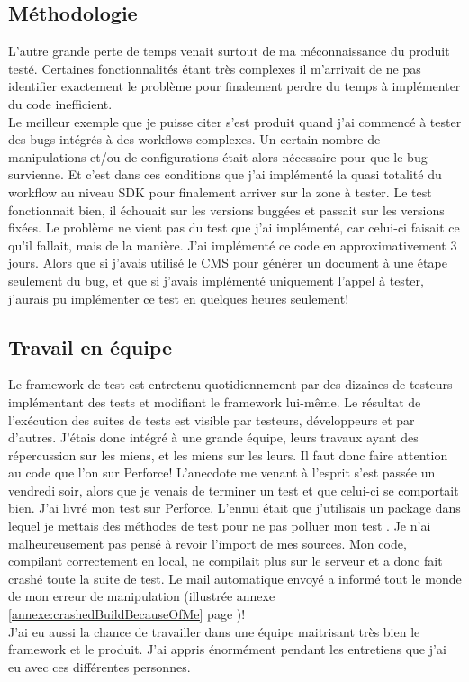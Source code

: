 \subsection{M\'{e}thodologie}
L'autre grande perte de temps venait surtout de ma m\'{e}connaissance du produit test\'{e}. Certaines fonctionnalit\'{e}s \'{e}tant tr\`{e}s complexes il m'arrivait de ne pas identifier exactement le probl\`{e}me pour finalement perdre du temps \`{a} impl\'{e}menter du code inefficient.\\
Le meilleur exemple que je puisse citer s'est produit quand j'ai commenc\'{e} \`{a} tester des bugs int\'{e}gr\'{e}s \`{a} des workflows complexes. Un certain nombre de manipulations et/ou de configurations \'{e}tait alors n\'{e}cessaire pour que le bug survienne. Et c'est dans ces conditions que j'ai impl\'{e}ment\'{e} la quasi totalit\'{e} du workflow au niveau SDK pour finalement arriver sur la zone \`{a} tester. Le test fonctionnait bien, il \'{e}chouait sur les versions bugg\'{e}es et passait sur les versions fix\'{e}es. Le probl\`{e}me ne vient pas du test que j'ai impl\'{e}ment\'{e}, car celui-ci faisait ce qu'il fallait, mais de la mani\`{e}re. J'ai impl\'{e}ment\'{e} ce code en approximativement 3 jours. Alors que si j'avais utilis\'{e} le CMS pour g\'{e}n\'{e}rer un document \`{a} une \'{e}tape seulement du bug, et que si j'avais impl\'{e}ment\'{e} uniquement l'appel \`{a} tester, j'aurais pu impl\'{e}menter ce test en quelques heures seulement!

\subsection{Travail en \'{e}quipe}
Le framework de test est entretenu quotidiennement par des dizaines de testeurs impl\'{e}mentant des tests et modifiant le framework lui-m\^{e}me. Le r\'{e}sultat de l'ex\'{e}cution des suites de tests est visible par testeurs, d\'{e}veloppeurs et par d'autres. J'\'{e}tais donc int\'{e}gr\'{e} \`{a} une grande \'{e}quipe, leurs travaux ayant des r\'{e}percussion sur les miens, et les miens sur les leurs. Il faut donc faire attention au code que l'on  sur Perforce! L'anecdote me venant \`{a} l'esprit s'est pass\'{e}e un vendredi soir, alors que je venais de terminer un test et que celui-ci se comportait bien. J'ai livr\'{e} mon test sur Perforce. L'ennui \'{e}tait que j'utilisais un package dans lequel je mettais des m\'{e}thodes de test pour ne pas polluer mon test . Je n'ai malheureusement pas pens\'{e} \`{a} revoir l'import de mes sources. Mon code, compilant correctement en local, ne compilait plus sur le serveur et a donc fait crash\'{e} toute la suite de test. Le mail automatique envoy\'{e} a inform\'{e} tout le monde de mon erreur de manipulation (illustr\'{e}e annexe \ref{annexe:crashedBuildBecauseOfMe} page \pageref{annexe:crashedBuildBecauseOfMe})!\\

J'ai eu aussi la chance de travailler dans une \'{e}quipe maitrisant tr\`{e}s bien le framework et le produit. J'ai appris \'{e}norm\'{e}ment pendant les entretiens que j'ai eu avec ces diff\'{e}rentes personnes.

